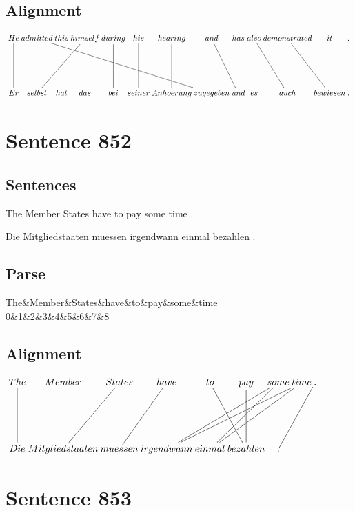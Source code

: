 \documentclass{report}
\begin{document}
\subsection*{Alignment}
\scriptsize{
$
\xymatrix@C-2.3pc{
He \ar @{-} [dd] & admitted \ar @{-} [ddrrrrrr] & this & himself \ar @{-} [ddll] & during \ar @{-} [dd] & his \ar @{-} [dd] & hearing \ar @{-} [dd] & and \ar @{-} [ddr] & has & also \ar @{-} [ddr] & demonstrated \ar @{-} [ddr] & it & .\\\\
Er & selbst & hat & das & bei & seiner & Anhoerung & zugegeben & und & es & auch & bewiesen & .
}$}
\newpage\section*{Sentence 852}

\subsection*{Sentences}
The Member States have to pay some time .

\noindent Die Mitgliedstaaten muessen irgendwann einmal bezahlen .



\subsection*{Parse}
\begin{dependency}[theme=simple]
\begin{deptext}[column sep=.5cm, row sep=.1ex]
The\&Member\&States\&have\&to\&pay\&some\&time\\
0\&1\&2\&3\&4\&5\&6\&7\&8\\
\end{deptext}
\end{dependency}


\subsection*{Alignment}
\scriptsize{
$
\xymatrix@C-2.3pc{
The \ar @{-} [dd] & Member \ar @{-} [dd] & States \ar @{-} [ddl] & have \ar @{-} [ddl] & to \ar @{-} [ddr] & pay \ar @{-} [dd] & some \ar @{-} [ddll] \ar @{-} [ddlll] & time \ar @{-} [ddllll] \ar @{-} [ddlll] & . \ar @{-} [ddll]\\\\
Die & Mitgliedstaaten & muessen & irgendwann & einmal & bezahlen & .
}$}
\newpage\section*{Sentence 853}
\end{document}
